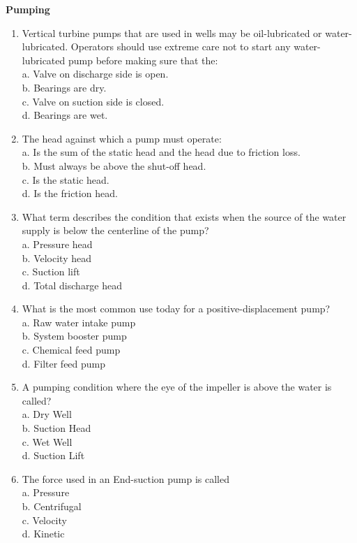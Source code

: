 \documentclass{article}
\begin{document}
\newpage
\textbf{Pumping}
\begin{enumerate}[1.]
\item Vertical turbine pumps that are used in wells may be oil-lubricated or water-lubricated. Operators should use extreme care not to start any water-lubricated pump before making sure that the:\\
a.	Valve on discharge side is open.\\
b. Bearings are dry.\\
c.	Valve on suction side is closed.\\
d.	Bearings are wet.

\item The head against which a pump must operate:\\
a.	Is the sum of the static head and the head due to friction loss.\\
b.	Must always be above the  shut-off  head.\\
c.	Is the static head.\\
d.	Is the friction head.

\item What term describes the condition that exists when the source of the water supply is below the  centerline of the  pump?\\
a.	Pressure  head\\
b.	Velocity head\\
c.	Suction lift\\
d.	Total discharge head

\item What is the most common use today for a positive-displacement pump?\\
a.	Raw water intake pump\\
b.	System booster pump\\
c.	Chemical feed pump\\
d.	Filter feed pump

\item A pumping condition where the eye of the impeller is above the water is called?\\
a.	Dry Well\\
b.	Suction Head\\
c.	Wet Well\\
d.	Suction Lift

\item The force used in an End-suction pump is called\\
a.	Pressure\\
b.	Centrifugal\\
c.	Velocity\\
d.	Kinetic\\


\end{enumerate}
\end{document}
